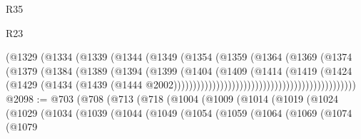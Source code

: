 \begin{lexlean}{R35}
\begin{lexlean}{R23}
\begin{coremodule}
{{{{{{{{{{{{{{{{{{{{{                                                  (@1329
                                                    (@1334
                                                      (@1339
                                                        (@1344
                                                          (@1349
                                                            (@1354
                                                              (@1359
                                                                (@1364
                                                                  (@1369
                                                                    (@1374
                                                                      (@1379
                                                                        (@1384
                                                                          (@1389
                                                                            (@1394
                                                                              (@1399
                                                                                (@1404
                                                                                  (@1409
                                                                                    (@1414
                                                                                      (@1419
                                                                                        (@1424
                                                                                          (@1429
                                                                                            (@1434
                                                                                              (@1439
                                                                                                (@1444
                                                                                                  @2002)))))))))))))))))))))))))))))))))))))))))))))))
@2098 := @703
    (@708
      (@713
        (@718
          (@1004
            (@1009
              (@1014
                (@1019
                  (@1024
                    (@1029
                      (@1034
                        (@1039
                          (@1044
                            (@1049
                              (@1054
                                (@1059
                                  (@1064
                                    (@1069
                                      (@1074
                                        (@1079
}}}}}}}}}}}}}}}}}}}}}
\end{coremodule}
\end{lexlean}
\end{lexlean}

